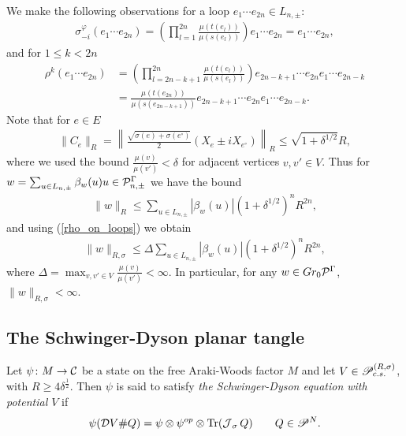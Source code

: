 We make the following observations for a loop $e_1\cdots e_{2n}\in L_{n,\pm}$:
\begin{align*}
\sigma_{-i}^\varphi(e_1\cdots e_{2n}) = \left(\prod_{l=1}^{2n} \frac{\mu(t(e_l))}{\mu(s(e_l))}\right) e_1\cdots e_{2n} = e_1\cdots e_{2n},
\end{align*}
and for $1\leq k< 2n$
\begin{align}\label{rho_on_loops}
\rho^k(e_1\cdots e_{2n}) &= \left(\prod_{l=2n-k+1}^{2n} \frac{\mu(t(e_l))}{\mu(s(e_l))}\right) e_{2n-k+1}\cdots e_{2n}e_1\cdots e_{2n-k}\nonumber\\
&= \frac{\mu(t(e_{2n}))}{\mu(s(e_{2n-k+1}))} e_{2n-k+1}\cdots e_{2n} e_1\cdots e_{2n-k}.
\end{align}
Note that for $e\in E$
\begin{align*}
\| C_e\|_R =\left\|\frac{\sqrt{\sigma(e)+\sigma(e^\circ)}}{2}(X_e\pm i X_{e^\circ})\right\|_R \leq \sqrt{1+\delta^{1/2}} R,
\end{align*}
where we used the bound $\frac{\mu(v)}{\mu(v')}<\delta$ for adjacent vertices $v,v'\in V$. Thus for $w= \sum_{u\in L_{n,\pm}} \beta_w(u) u \in \mc{P}^\Gamma_{n,\pm}$ we have the bound
\begin{align*}
\|w\|_R \leq \sum_{u\in L_{n,\pm}} |\beta_w(u)|(1+\delta^{1/2})^n R^{2n},
\end{align*}
and using (\ref{rho_on_loops}) we obtain
\begin{align*}
\|w\|_{R,\sigma} \leq \Delta \sum_{u\in L_{n,\pm}} |\beta_w(u)|(1+\delta^{1/2})^n R^{2n},
\end{align*}
where $\Delta= \max_{v,v'\in V} \frac{\mu(v)}{\mu(v')}<\infty$. In particular, for any $w\in Gr_0 \mc{P}^\Gamma$, $\|w\|_{R,\sigma}<\infty$.






\subsection{The Schwinger-Dyson planar tangle}


Let $\psi\colon M\to \C$ be a state on the free Araki-Woods factor $M$ and let $V\in \P^{(R,\sigma)}_{c.s.}$, with $R\geq 4\delta^\frac{1}{2}$. Then $\psi$ is said to satisfy \emph{the Schwinger-Dyson equation with potential $V$} if
\begin{align*}
\psi( \D V \# Q)=\psi\otimes\psi^{op}\otimes\text{Tr}(\J_\sigma Q)\qquad Q\in \P^N.
\end{align*}

